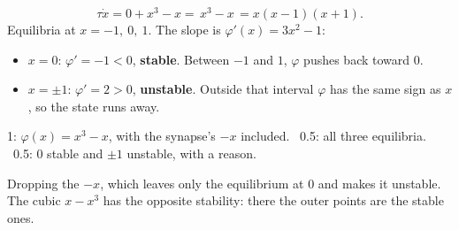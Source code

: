 \documentclass[11pt,letterpaper]{article}
\newcommand{\ans}[1]{\par\vspace{4pt}{\bfseries #1}\quad}
\begin{document}
\ans{(a) [2]}
\[
\tau\dot x = 0 + x^3 - x = \boxed{\,x^3 - x\,} = x(x - 1)(x + 1).
\]
Equilibria at $x = -1,\ 0,\ 1$. The slope is $\varphi'(x) = 3x^2 - 1$:
\begin{itemize}[leftmargin=1.2em]
\item $x = 0$: $\varphi' = -1 < 0$, \textbf{stable}. Between $-1$ and $1$, $\varphi$ pushes back toward $0$.
\item $x = \pm 1$: $\varphi' = 2 > 0$, \textbf{unstable}. Outside that interval $\varphi$ has the same sign as $x$, so the state runs away.
\end{itemize}
\begin{marking}
1: $\varphi(x) = x^3 - x$, with the synapse's $-x$ included. \ 0.5: all three equilibria. \ 0.5: $0$ stable and $\pm 1$ unstable, with a reason.
\end{marking}
\begin{trap}
Dropping the $-x$, which leaves only the equilibrium at $0$ and makes it unstable. The cubic $x - x^3$ has the opposite stability: there the outer points are the stable ones.
\end{trap}
\end{document}
